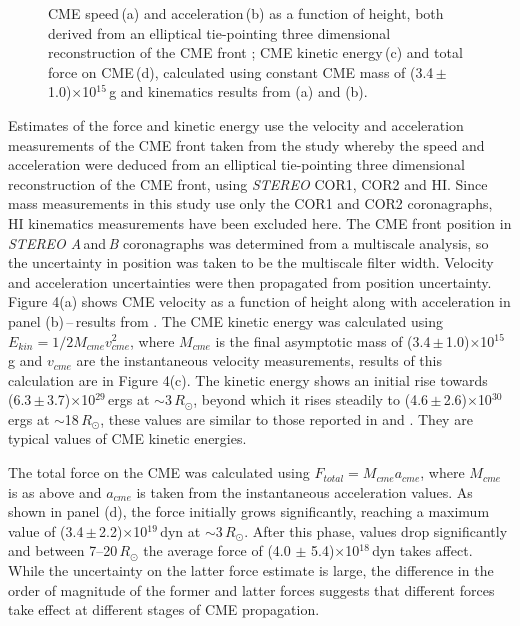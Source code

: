 \documentclass{emulateapj}
\begin{document}
\begin{figure}[h!]
\caption{CME speed\,(a) and acceleration\,(b) as a function of height, both derived from an elliptical tie-pointing three dimensional reconstruction of the CME front \citep{byr10};
CME kinetic energy\,(c) and total force on CME\,(d), calculated using constant CME mass of (3.4\,$\pm$\,1.0)$\times$10$^{15}$\,g and kinematics results from (a) and (b).}
\label{fig:force_20081212}
\end{figure}
Estimates of the force and kinetic energy use the velocity and acceleration measurements of the CME front taken from the \citet{byr10} study whereby the speed and acceleration were deduced from an elliptical tie-pointing three dimensional reconstruction of the CME front, using \emph{STEREO} COR1, COR2 and HI. Since mass measurements in this study use only the COR1 and COR2 coronagraphs, HI kinematics measurements have been excluded here. The CME front position in \emph{STEREO A}\,and\,\emph{B} coronagraphs was determined from a multiscale analysis, so the uncertainty in position was taken to be the multiscale filter width. Velocity and acceleration uncertainties were then propagated from position uncertainty.  Figure 4(a) shows CME velocity as a function of height along with acceleration in panel (b)\,--\,results from \citet{byr10}. The CME kinetic energy was calculated using $E_{kin}=1/2M_{cme}v_{cme}^{2}$, where $M_{cme}$ is the final asymptotic mass of (3.4\,$\pm$\,1.0)$\times$10$^{15}$\,g and $v_{cme}$ are the instantaneous velocity measurements, results of this calculation are in Figure 4(c). The kinetic energy shows an initial rise towards (6.3\,$\pm$\,3.7)$\times$10$^{29}$\,ergs at $\sim$3\,$R_{\odot}$, beyond which it rises steadily to (4.6\,$\pm$\,2.6)$\times$10$^{30}$\,ergs at $\sim$18\,$R_{\odot}$, these values are similar to those reported in \citet{vou00,vour2010} and \citet{emslie2004}. They are typical values of CME kinetic energies.

The total force on the CME was calculated using $F_{total}=M_{cme}a_{cme}$, where $M_{cme}$ is as above and $a_{cme}$ is taken from the instantaneous acceleration values.  
As shown in panel (d), the force initially grows significantly, reaching a maximum value of (3.4\,$\pm$\,2.2)$\times$10$^{19}$\,dyn at $\sim$3\,$R_{\odot}$. After this phase, values drop significantly and between 7--20\,$R_{\odot}$ the average force of (4.0 $\pm$ 5.4)$\times$10$^{18}$\,dyn takes affect.  While the uncertainty on the latter force estimate is large, the difference in the order of magnitude of the former and latter forces suggests that different forces take effect at different stages of CME propagation. 
\end{document}
